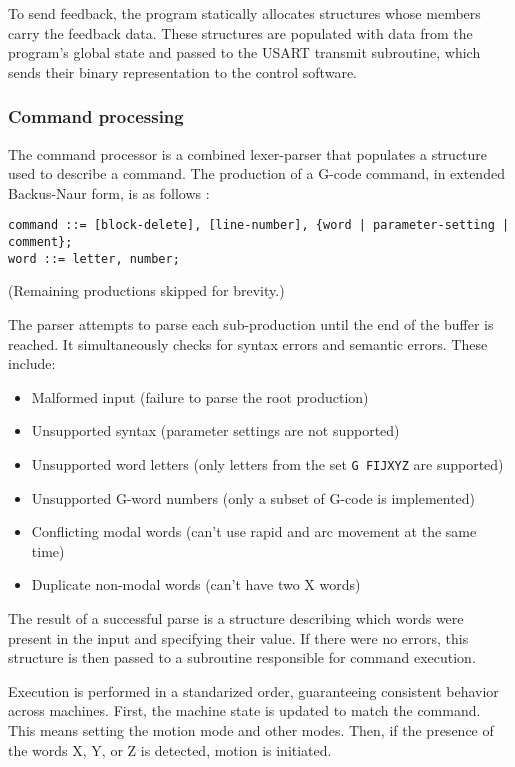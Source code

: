 To send feedback, the program statically allocates structures whose members
carry the feedback data. These structures are populated with data from the
program's global state and passed to the USART transmit subroutine, which sends
their binary representation to the control software.

\subsubsection{Command processing}

The command processor is a combined lexer-parser that populates a structure used
to describe a command. The production of a G-code command, in extended
Backus-Naur form, is as follows \cite{gcode}:
\footnotesize
\begin{verbatim}command ::= [block-delete], [line-number], {word | parameter-setting | comment};
word ::= letter, number;\end{verbatim}
\normalsize
(Remaining productions skipped for brevity.)

The parser attempts to parse each sub-production until the end of the buffer is
reached. It simultaneously checks for syntax errors and semantic errors. These
include:
\begin{itemize}
    \item Malformed input (failure to parse the root production)
    \item Unsupported syntax (parameter settings are not supported)
    \item Unsupported word letters (only letters from the set \texttt{G FIJXYZ}
    are supported)
    \item Unsupported G-word numbers (only a subset of G-code is implemented)
    \item Conflicting modal words (can't use rapid and arc movement at the same
    time)
    \item Duplicate non-modal words (can't have two X words)
\end{itemize}
The result of a successful parse is a structure describing which words were
present in the input and specifying their value. If there were no errors, this
structure is then passed to a subroutine responsible for command execution.

Execution is performed in a standarized order, guaranteeing consistent behavior
across machines. First, the machine state is updated to match the command. This
means setting the motion mode and other modes. Then, if the presence of the
words X, Y, or Z is detected, motion is initiated.


